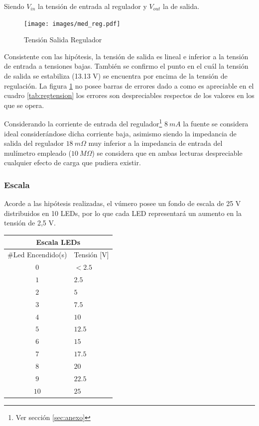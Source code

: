 \documentclass[12pt,a4paper]{article}
\begin{document}
			Siendo $V_{in}$ la tensión de entrada al regulador y $V_{out}$ la de salida.

			\begin{figure}[H]
			\centering
				\texttt{[image: images/med\_reg.pdf]}\caption{Tensión Salida Regulador}\label{fig:grafreg}
			\end{figure}

			Consistente con las hipótesis, la tensión de salida es lineal e inferior a la tensión de entrada a tensiones bajas. También se confirmo el punto en el cuál la tensión de salida se estabiliza (13.13 V) se encuentra por encima de la tensión de regulación. La figura \ref{fig:grafreg} no posee barras de errores dado a como es apreciable en el cuadro \ref{tab:regtension} los errores son despreciables respectos de los valores en los que se opera.

			Considerando la corriente de entrada del regulador\footnote{Ver sección \ref{sec:anexo}}  $8 \: mA$ la fuente se considera ideal considerándose dicha corriente baja, asimismo siendo la impedancia de salida del regulador $18 \: m\Omega$ muy inferior a la impedancia de entrada del mulímetro empleado ($10 \: M\Omega$) se considera que en ambas lecturas despreciable cualquier efecto de carga que pudiera existir. 

			\subsubsection{Escala}
				Acorde a las hipótesis realizadas, el vúmero posee un fondo de escala de 25 V distribuidos en 10 LEDs, por lo que cada LED representará un aumento en la tensión de 2,5 V. 

				\begin{center}
			{\footnotesize \begin{tabular}{ |c|l| }

			\hline
				\multicolumn{2}{|c|}{\textbf{Escala LEDs}}\\ \hline
				$\#$Led Encendido(s) & Tensión [V] \\ \hline
				$0$ & $< 2.5$ \\ \hline
				$1$ & $2.5$ \\ \hline
				$2$ & $5$ \\ \hline
				$3$ & $7.5$ \\ \hline
				$4$ & $10$ \\ \hline
				$5$ & $12.5$ \\ \hline
				$6$ & $15$ \\ \hline
				$7$ & $17.5$ \\ \hline
				$8$ & $20$ \\ \hline
				$9$ & $22.5$ \\ \hline
				$10$ & $25$ \\ \hline			
 				
				
			\end{tabular}}\label{tab:escala}
			\end{center}
\end{document}

